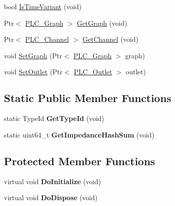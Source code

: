 \begin{DoxyCompactItemize}
\item 
bool \hyperlink{classns3_1_1PLC__Node_a07aa4b7127953ab3285c50d00ebd550d}{\-Is\-Time\-Variant} (void)
\item 
\-Ptr$<$ \hyperlink{classns3_1_1PLC__Graph}{\-P\-L\-C\-\_\-\-Graph} $>$ \hyperlink{classns3_1_1PLC__Node_aa4f801cb511cb5d99b5918ae47d74b18}{\-Get\-Graph} (void)
\item 
\-Ptr$<$ \hyperlink{classns3_1_1PLC__Channel}{\-P\-L\-C\-\_\-\-Channel} $>$ \hyperlink{classns3_1_1PLC__Node_a1af9782b5b1703cb60b149fde6ea5c53}{\-Get\-Channel} (void)
\item 
void \hyperlink{classns3_1_1PLC__Node_afd7f60aa8c6cb699b303fe3bba4035d2}{\-Set\-Graph} (\-Ptr$<$ \hyperlink{classns3_1_1PLC__Graph}{\-P\-L\-C\-\_\-\-Graph} $>$ graph)
\item 
void \hyperlink{classns3_1_1PLC__Node_abbd0e0d52256ff736e33a22c708f1111}{\-Set\-Outlet} (\-Ptr$<$ \hyperlink{classns3_1_1PLC__Outlet}{\-P\-L\-C\-\_\-\-Outlet} $>$ outlet)
\end{DoxyCompactItemize}
\subsection*{\-Static \-Public \-Member \-Functions}
\begin{DoxyCompactItemize}
\item 
\hypertarget{classns3_1_1PLC__Node_a5a51763811f8468bffb7d0f34e8eedd5}{static \-Type\-Id {\bfseries \-Get\-Type\-Id} (void)}\label{classns3_1_1PLC__Node_a5a51763811f8468bffb7d0f34e8eedd5}

\item 
\hypertarget{classns3_1_1PLC__Node_abea56a73f524e9817bc1847b5d9ba82d}{static uint64\-\_\-t {\bfseries \-Get\-Impedance\-Hash\-Sum} (void)}\label{classns3_1_1PLC__Node_abea56a73f524e9817bc1847b5d9ba82d}

\end{DoxyCompactItemize}
\subsection*{\-Protected \-Member \-Functions}
\begin{DoxyCompactItemize}
\item 
\hypertarget{classns3_1_1PLC__Node_a4a29e9bd60301a431ab162f2eb159961}{virtual void {\bfseries \-Do\-Initialize} (void)}\label{classns3_1_1PLC__Node_a4a29e9bd60301a431ab162f2eb159961}

\item 
\hypertarget{classns3_1_1PLC__Node_aba36f5bab59110d3f39c8fb34e956f23}{virtual void {\bfseries \-Do\-Dispose} (void)}\label{classns3_1_1PLC__Node_aba36f5bab59110d3f39c8fb34e956f23}

\end{DoxyCompactItemize}
